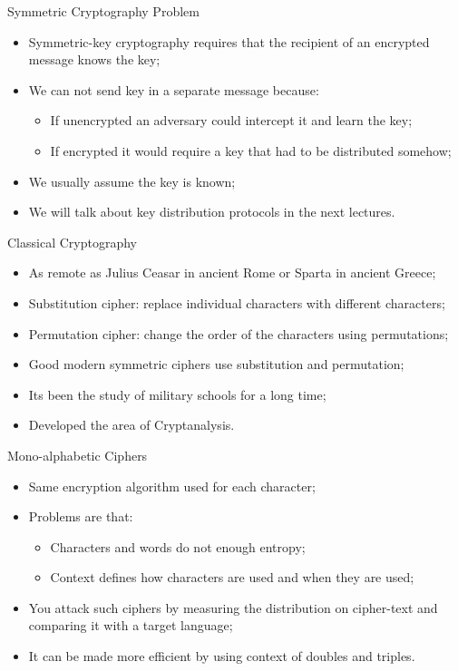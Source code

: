 \documentclass[12pt,table,xcolor={dvipsnames}]{beamer}
\begin{document}
\begin{frame}{Symmetric Cryptography Problem}
\begin{itemize}
\item Symmetric-key cryptography requires that the recipient of an encrypted message knows the key;\pause
\item We can not send key in a separate message because:\pause
\begin{itemize}
\item If unencrypted an adversary could intercept it and learn the key;\pause
\item If encrypted it would require a key that had to be distributed somehow;\pause
\end{itemize} 
\item We usually assume the key is known;\pause
\item We will talk about key distribution protocols in the next lectures.
\end{itemize}
\end{frame}

\begin{frame}{Classical Cryptography}
\begin{itemize}
\item As remote as Julius Ceasar in ancient Rome or Sparta in ancient Greece;\pause
\item Substitution cipher: replace individual characters with different characters;\pause
\item Permutation cipher: change the order of the characters using permutations;\pause
\item Good modern symmetric ciphers use substitution and permutation;\pause
\item Its been the study of military schools for a long time;\pause
\item Developed the area of Cryptanalysis.
\end{itemize}
\end{frame}

\begin{frame}{Mono-alphabetic Ciphers}
\begin{itemize}
\item Same encryption algorithm used for each character;\pause
\item Problems are that:\pause
\begin{itemize}
\item Characters and words do not enough entropy;\pause
\item Context defines how characters are used and when they are used;\pause
\end{itemize}
\item You attack such ciphers by measuring the distribution on cipher-text and comparing it with a target language;\pause
\item It can be made more efficient by using context of doubles and triples.
\end{itemize}
\end{frame}
\end{document}
